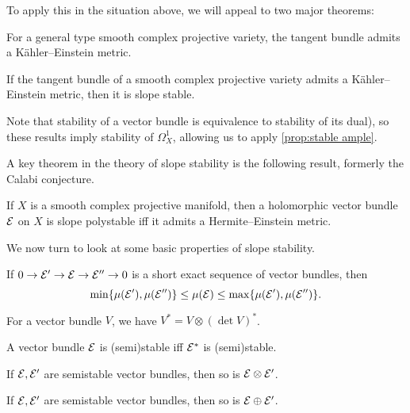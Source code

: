 

To apply this in the situation above, we will appeal to two major theorems:


\begin{theorem}
    For a general type smooth complex projective variety, the tangent bundle
    admits a K\"ahler--Einstein metric.
\end{theorem}

\begin{theorem}
    If the tangent bundle of a smooth complex projective variety admits a
    K\"ahler--Einstein metric, then it is slope stable.
\end{theorem}

Note that stability of a vector bundle is equivalence to stability of its dual),
so these results imply stability of $\Omega^1_X$, allowing us to apply
\cref{prop:stable ample}.

A key theorem in the theory of slope stability is the following result, formerly
the Calabi conjecture.

\begin{theorem} %
    If $X$ is a smooth complex projective manifold, then a holomorphic vector
    bundle $\mathcal{E}$ on $X$ is slope polystable iff it admits a Hermite--Einstein
    metric.
\end{theorem}

We now turn to look at some basic properties of slope stability.

\begin{proposition}
    If $0\to\mathcal{E}'\to\mathcal{E}\to\mathcal{E}''\to0$ is a short exact sequence of vector
    bundles, then
    \begin{equation*}
        \min\{\mu(\mathcal{E}'),\mu(\mathcal{E}'')\}
            \le \mu(\mathcal{E}) \le \max\{\mu(\mathcal{E}'),\mu(\mathcal{E}'')\}.
    \end{equation*}
\end{proposition}

\begin{lemma}
    For a vector bundle $V$, we have $V^*=V\otimes(\det V)^*$.
\end{lemma}

\begin{proposition}
    A vector bundle $\mathcal{E}$ is (semi)stable iff $\mathcal{E}^*$ is (semi)stable.
\end{proposition}

\begin{proposition}
    If $\mathcal{E},\mathcal{E}'$ are semistable vector bundles, then so is
    $\mathcal{E}\otimes\mathcal{E}'$.
\end{proposition}

\begin{proposition}
    If $\mathcal{E},\mathcal{E}'$ are semistable vector bundles, then so is
    $\mathcal{E}\oplus\mathcal{E}'$.
\end{proposition}
